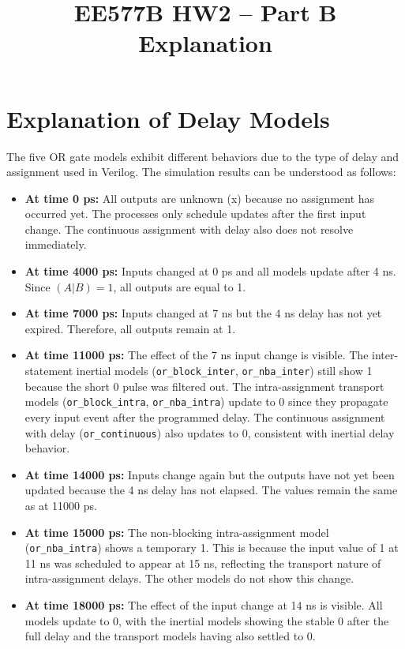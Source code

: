 \documentclass[11pt]{article}
\title{EE577B HW2 -- Part B Explanation}
\author{}
\date{}
\begin{document}
\maketitle

\vspace{-50pt}

\section*{Explanation of Delay Models}

The five OR gate models exhibit different behaviors due to the type of delay and assignment used in Verilog. The simulation results can be understood as follows:

\begin{itemize}
    \item \textbf{At time 0 ps:} All outputs are unknown (x) because no assignment has occurred yet. The processes only schedule updates after the first input change. The continuous assignment with delay also does not resolve immediately.

    \item \textbf{At time 4000 ps:} Inputs changed at 0 ps and all models update after 4 ns. Since $(A | B) = 1$, all outputs are equal to 1.

    \item \textbf{At time 7000 ps:} Inputs changed at 7 ns but the 4 ns delay has not yet expired. Therefore, all outputs remain at 1.

    \item \textbf{At time 11000 ps:} The effect of the 7 ns input change is visible. The inter-statement inertial models (\texttt{or\_block\_inter}, \texttt{or\_nba\_inter}) still show 1 because the short 0 pulse was filtered out. The intra-assignment transport models (\texttt{or\_block\_intra}, \texttt{or\_nba\_intra}) update to 0 since they propagate every input event after the programmed delay. The continuous assignment with delay (\texttt{or\_continuous}) also updates to 0, consistent with inertial delay behavior.

    \item \textbf{At time 14000 ps:} Inputs change again but the outputs have not yet been updated because the 4 ns delay has not elapsed. The values remain the same as at 11000 ps.

    \item \textbf{At time 15000 ps:} The non-blocking intra-assignment model (\texttt{or\_nba\_intra}) shows a temporary 1. This is because the input value of 1 at 11 ns was scheduled to appear at 15 ns, reflecting the transport nature of intra-assignment delays. The other models do not show this change.

    \item \textbf{At time 18000 ps:} The effect of the input change at 14 ns is visible. All models update to 0, with the inertial models showing the stable 0 after the full delay and the transport models having also settled to 0.
\end{itemize}
\end{document}
